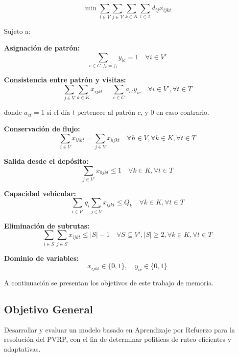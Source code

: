 \begin{equation}
\min \sum_{i \in V} \sum_{j \in V} \sum_{k \in K} \sum_{t \in T} d_{ij} x_{ijkt}
\end{equation}

Sujeto a:

\textbf{Asignación de patrón:}
\begin{equation}
\sum_{c \in C: f_c = f_i} y_{ic} = 1 \quad \forall i \in V'
\end{equation}

\textbf{Consistencia entre patrón y visitas:}
\begin{equation}
\sum_{j \in V} \sum_{k \in K} x_{ijkt} = \sum_{c \in C} a_{ct} y_{ic} \quad \forall i \in V', \forall t \in T
\end{equation}

donde $a_{ct} = 1$ si el día $t$ pertenece al patrón $c$, y 0 en caso contrario.

\textbf{Conservación de flujo:}
\begin{equation}
\sum_{i \in V} x_{ihkt} = \sum_{j \in V} x_{hjkt} \quad \forall h \in V, \forall k \in K, \forall t \in T
\end{equation}

\textbf{Salida desde el depósito:}
\begin{equation}
\sum_{j \in V'} x_{0jkt} \leq 1 \quad \forall k \in K, \forall t \in T
\end{equation}

\textbf{Capacidad vehicular:}
\begin{equation}
\sum_{i \in V'} q_i \sum_{j \in V} x_{ijkt} \leq Q_k \quad \forall k \in K, \forall t \in T
\end{equation}

\textbf{Eliminación de subrutas:}
\begin{equation}
\sum_{i \in S} \sum_{j \in S} x_{ijkt} \leq |S| - 1 \quad \forall S \subseteq V', |S| \geq 2, \forall k \in K, \forall t \in T
\end{equation}

\textbf{Dominio de variables:}
\begin{equation}
x_{ijkt} \in \{0,1\}, \quad y_{ic} \in \{0,1\}
\end{equation}

A continuación se presentan los objetivos de este trabajo de memoria.

\subsection{Objetivo General} \label{sec:ObjetivoGeneral}
Desarrollar y evaluar un modelo basado en Aprendizaje por Refuerzo para la resolución del PVRP, con el fin de determinar políticas de ruteo eficientes y adaptativas.

